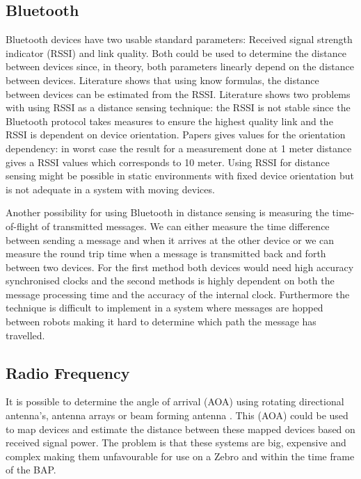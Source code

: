 \subsection*{Bluetooth}

Bluetooth devices have two usable standard parameters: Received signal strength indicator (RSSI) and link quality. Both could be used to determine the distance between devices since, in theory, both parameters linearly depend on the distance between devices. Literature shows that using know formulas, the distance between devices can be estimated from the RSSI. Literature \cite{Forno2005} shows two problems with using RSSI as a distance sensing technique: the RSSI is not stable since the Bluetooth protocol takes measures to ensure the highest quality link and the RSSI is dependent on device orientation. Papers \cite{Scheerens2012,Dahlgren2014} gives values for the orientation dependency: in worst case the result for a measurement done at 1 meter distance gives a RSSI values which corresponds to 10 meter. Using RSSI for distance sensing might be possible in static environments with fixed device orientation but is not adequate in a system with moving devices.

Another possibility for using Bluetooth in distance sensing is measuring the time-of-flight of transmitted messages. We can either measure the time difference between sending a message and when it arrives at the other device or we can measure the round trip time when a message is transmitted back and forth between two devices. For the first method both devices would need high accuracy synchronised clocks \cite{Ekberg2009} and the second methods is highly dependent on both the message processing time and the accuracy of the internal clock. Furthermore the technique is difficult to implement in a system where messages are hopped between robots making it hard to determine which path the message has travelled.

\subsection*{Radio Frequency}

It is possible to determine the angle of arrival (AOA) using rotating directional antenna's, antenna arrays or beam forming antenna \cite{Min2016}. This (AOA) could be used to map devices and estimate the distance between these mapped devices based on received signal power. The problem is that these systems are big, expensive and complex making them unfavourable for use on a Zebro and within the time frame of the BAP.

